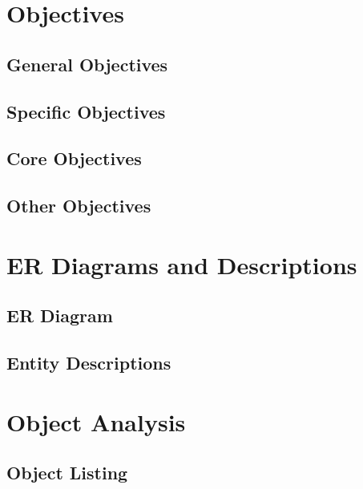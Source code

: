 \section{Objectives}

\subsection{General Objectives}




\subsection{Specific Objectives}



\subsection{Core Objectives}



\subsection{Other Objectives}



\section{ER Diagrams and Descriptions}

\subsection{ER Diagram}



\subsection{Entity Descriptions}



\section{Object Analysis}

\subsection{Object Listing}



